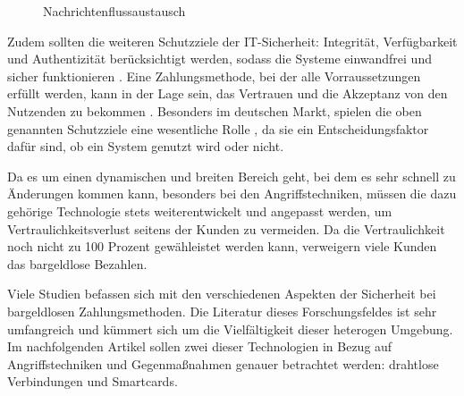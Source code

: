 \vfill
\begin{figure}[H]
    \caption{Nachrichtenflussaustausch \cite{refart:JTAS}}
    \label{fig:refart:JTAS_2}
\end{figure}
\vfill


Zudem sollten die weiteren Schutzziele der IT-Sicherheit: Integrität, Verfügbarkeit und Authentizität
berücksichtigt werden, sodass die Systeme einwandfrei und sicher funktionieren \cite{refip:GMPS}. 
Eine Zahlungsmethode, bei der alle Vorraussetzungen erfüllt werden, kann in der Lage sein, das Vertrauen 
und die Akzeptanz von den Nutzenden zu bekommen \cite{refart:HARE}. Besonders im deutschen Markt, spielen
die oben genannten Schutzziele eine wesentliche Rolle \cite{refip:DKAM}, da sie ein Entscheidungsfaktor 
dafür sind, ob ein System genutzt wird oder nicht.


Da es um einen dynamischen und breiten Bereich geht, bei dem es sehr schnell zu Änderungen kommen kann, 
besonders bei den Angriffstechniken, müssen die dazu gehörige \cite{refip:NYRS} Technologie stets 
weiterentwickelt und angepasst werden, um Vertraulichkeitsverlust seitens der Kunden zu vermeiden. 
Da die Vertraulichkeit noch nicht zu 100 Prozent gewähleistet werden kann, verweigern viele Kunden
das bargeldlose Bezahlen.


Viele Studien befassen sich mit den verschiedenen Aspekten der Sicherheit bei bargeldlosen Zahlungsmethoden.
Die Literatur dieses Forschungsfeldes ist sehr umfangreich und kümmert sich um die Vielfältigkeit 
dieser heterogen \cite{refip:GMPS} Umgebung. Im nachfolgenden Artikel sollen zwei dieser Technologien 
in Bezug auf Angriffstechniken und Gegenmaßnahmen genauer betrachtet werden: drahtlose Verbindungen und 
Smartcards.

